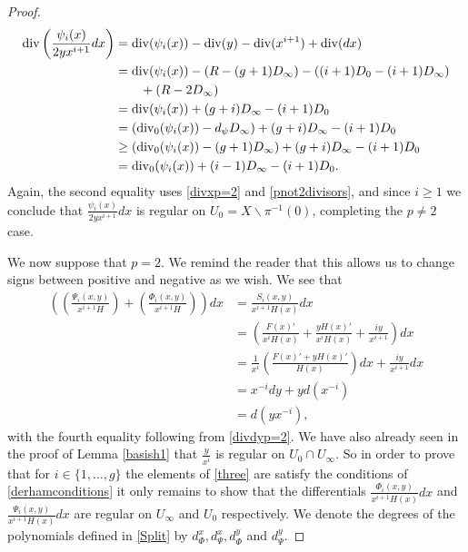 \begin{proof}
        \begin{align*}
        \operatorname{div} \left( \frac{\psi_i(x)}{2yx^{i+1}}dx\right) & =  \operatorname{div}(\psi_i(x)) - \operatorname{div}(y) - \operatorname{div}(x^{i+1}) + \operatorname{div} (dx) \\
        & =  \operatorname{div} (\psi_i(x) ) -(R - (g+1)D_\infty) - ((i+1)D_0 - (i+1)D_\infty) \\ 
        & \qquad + (R -2D_\infty) \\
        & =  \operatorname{div}(\psi_i(x)) + (g+i)D_\infty -(i+1)D_0 \\
        & =  (\operatorname{div}_0(\psi_i(x)) -d_\psi D_\infty) + (g+i)D_\infty -(i+1)D_0 \\
        & \geq \left( \operatorname{div}_0(\psi_i(x)) - (g+1)D_\infty \right) + (g+i)D_\infty -(i+1)D_0 \\
        & =  \operatorname{div}_0(\psi_i(x)) + (i-1)D_\infty - (i+1)D_0.
        \end{align*}
    Again, the second equality uses \eqref{divxp=2} and \eqref{pnot2divisors}, and since $i\geq 1$ we conclude that $\frac{\psi_i(x)}{2yx^{i+1}}dx$ is regular on $U_0 = X \backslash \pi^{-1}(0)$, completing the $p\neq 2$ case.
    
    
    We now suppose that $p=2$.
    We remind the reader that this allows us to change signs between positive and negative as we wish.
    We see that
        \begin{align*}
        \left( \left( \frac{ \Psi_i(x,y)}{x^{i+1}H} \right) + \left( \frac{\Phi_i(x,y)}{x^{i+1}H} \right) \right) dx & =  \frac{S_i(x,y)}{x^{i+1}H(x)}dx \\
        & =  \left( \frac{F(x)'}{x^iH(x)} + \frac{yH(x)'}{x^iH(x)} + \frac{iy}{x^{i+1}} \right) dx \\
        & =  \frac{1}{x^i}\left( \frac{F(x)' + yH(x)'}{H(x)} \right) dx + \frac{iy}{x^{i+1}}dx \\
        & =  x^{-i}dy + yd \left( x^{-i}\right) \\
        & =  d\left( yx^{-i}\right),
        \end{align*}
    with the fourth equality following from \eqref{divdyp=2}.
    We have also already seen in the proof of Lemma \ref{basish1} that $\frac{y}{x^i}$ is regular on $U_0 \cap U_\infty$.
    So in order to prove that for $i\in \{1, \ldots, g\}$ the elements of \eqref{three} are satisfy the conditions of \eqref{derhamconditions} it only remains to show that the differentials $\frac{\Phi_i(x,y)}{x^{i+1}H(x)}dx$ and $\frac{\Psi_i(x,y)}{x^{i+1}H(x)}dx$ are regular on $U_\infty$ and $U_0$ respectively.
    We denote the degrees of the polynomials defined in \eqref{Split} by $d_{\Phi}^x, d_{\Psi}^x, d_{\Phi}^y$ and $d_{\Psi}^y$.
    

\end{proof}

